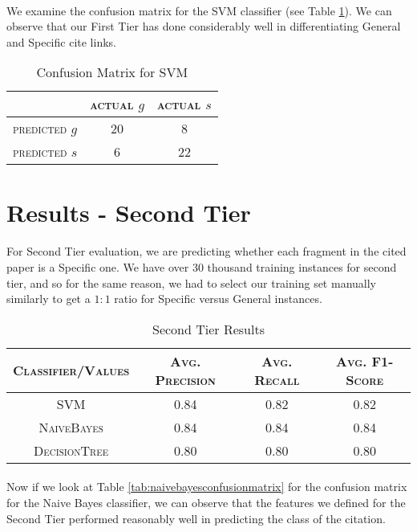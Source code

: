 \paragraph{}
We examine the confusion matrix for the SVM classifier (see Table \ref{tab:svmconfusionmatrix}). We can observe that our First Tier has done considerably well in differentiating General and Specific cite links.

\begin{table}[h]
	\center
	\begin{tabular}{ c | c  c }
		 & \textsc{actual $g$} & \textsc{actual $s$} \\
		\hline
		\textsc{predicted $g$} 	& 20 & 8 \\
		\textsc{predicted $s$}		& 6 & 22
	\end{tabular}
	\caption{Confusion Matrix for SVM}
	\label{tab:svmconfusionmatrix}
\end{table}

\section{Results - Second Tier}
\paragraph{}
For Second Tier evaluation, we are predicting whether each fragment in the cited paper is a Specific one. We have over 30 thousand training instances for second tier, and so for the same reason, we had to select our training set manually similarly to get a $1:1$ ratio for Specific versus General instances.

\begin{table}[h]
	\center
	\begin{tabular}{ c | c  c  c }
		\textsc{Classifier/Values} & \textsc{Avg. Precision} & \textsc{Avg. Recall} & \textsc{Avg. F1-Score} \\
		\hline
		\textsc{SVM} 			& 0.84 & 0.82 & 0.82 \\
		\textsc{NaiveBayes} 	& 0.84 & 0.84 & 0.84 \\
		\textsc{DecisionTree}	& 0.80 & 0.80 & 0.80
	\end{tabular}
	\caption{Second Tier Results}
	\label{tab:secondtieresults}
\end{table}
\newpage
\paragraph{}
Now if we look at Table \ref{tab:naivebayesconfusionmatrix} for the confusion matrix for the Naive Bayes classifier, we can observe that the features we defined for the Second Tier performed reasonably well in predicting the class of the citation. 


